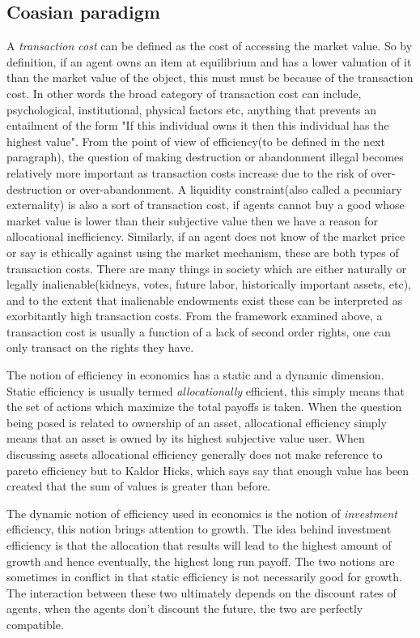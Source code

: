 \documentclass[12pt]{article}
\numberwithin{equation}{section}
\begin{document}
\subsection{Coasian paradigm}

A \textit{transaction cost} can be defined as the cost of accessing the market value. So by definition, if an agent owns an item at equilibrium and has a lower valuation of it than the market value of the object, this must must be because of the transaction cost. In other words the broad category of transaction cost can include, psychological, institutional, physical factors etc, anything that prevents an entailment of the form "If this individual owns it then this individual has the highest value". From the point of view of efficiency(to be defined in the next paragraph), the question of making destruction or abandonment illegal becomes relatively more important as transaction costs increase due to the risk of over-destruction or over-abandonment. A liquidity constraint(also called a pecuniary externality) is also a sort of transaction cost, if agents cannot buy a good whose market value is lower than their subjective value then we have a reason for allocational inefficiency. Similarly, if an agent does not know of the market price or say is ethically against using the market mechanism, these are both types of transaction costs. There are many things in society which are either naturally or legally inalienable(kidneys, votes, future labor, historically important assets, etc), and to the extent that inalienable endowments exist these can be interpreted as exorbitantly high transaction costs. From the framework examined above, a transaction cost is usually a function of a lack of second order rights, one can only transact on the rights they have.

The notion of efficiency in economics has a static and a dynamic dimension. Static efficiency is usually termed \textit{allocationally} efficient, this simply means that the set of actions which maximize the total payoffs is taken. When the question being posed is related to ownership of an asset, allocational efficiency simply means that an asset is owned by its highest subjective value user. When discussing assets allocational efficiency generally does not make reference to pareto efficiency but to Kaldor Hicks, which says say that enough value has been created that the sum of values is greater than before.

The dynamic notion of efficiency used in economics is the notion of \textit{investment} efficiency, this notion brings attention to growth. The idea behind investment efficiency is that the allocation that results will lead to the highest amount of growth and hence eventually, the highest long run payoff. The two notions are sometimes in conflict in that static efficiency is not necessarily good for growth. The interaction between these two ultimately depends on the discount rates of agents, when the agents don't discount the future, the two are perfectly compatible.
\end{document}
